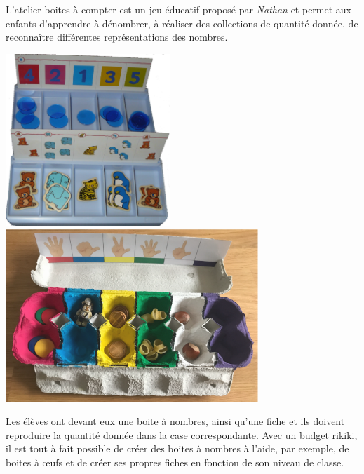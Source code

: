 \begin{exercice*}
   \og L'atelier boites à compter \fg{} est un jeu éducatif proposé par {\it Nathan} et permet aux enfants d'apprendre à dénombrer, à réaliser des collections de quantité donnée, de reconnaître différentes représentations des nombres. \\
   \begin{center}
      \includegraphics[height=6.5cm]{Nombres_et_calculs_did/Images/Num1_activites_boite_compter_Nathan} \qquad\includegraphics[height=6.5cm]{Nombres_et_calculs_did/Images/Num1_activites_boite_oeufs_nombres}
   \end{center} \bigskip
 
   Les élèves ont devant eux une boite à nombres, ainsi qu'une fiche et ils doivent reproduire la quantité donnée dans la case correspondante. Avec un budget rikiki, il est tout à fait possible de créer des boites à nombres à l'aide, par exemple, de boites à \oe ufs et de créer ses propres fiches en fonction de son niveau de classe.


\end{exercice*}
